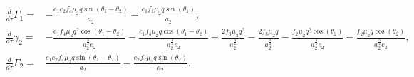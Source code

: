 \documentclass[usenatbib,twocolumn]{mnras}
\begin{document}
\begin{align}
    \frac{d}{d\tau} \Gamma_1 =&- \frac{e_{1} e_{2} f_{4} \mu_{2} q \sin{\left(\theta_{1} - \theta_{2} \right)}}{a_{2}} - \frac{e_{1} f_{1} \mu_{2} q \sin{\left(\theta_{1} \right)}}{a_{2}},\\
    \frac{d}{d\tau} \gamma_2 =&- \frac{e_{1} f_{4} \mu_{2} q^{2} \cos{\left(\theta_{1} - \theta_{2} \right)}}{a_{2}^{\frac{3}{2}} e_{2}} - \frac{e_{1} f_{4} \mu_{2} q \cos{\left(\theta_{1} - \theta_{2} \right)}}{a_{2}^{\frac{3}{2}} e_{2}} - \frac{2 f_{3} \mu_{2} q^{2}}{a_{2}^{\frac{3}{2}}} - \frac{2 f_{3} \mu_{2} q}{a_{2}^{\frac{3}{2}}} - \frac{f_{2} \mu_{2} q^{2} \cos{\left(\theta_{2} \right)}}{a_{2}^{\frac{3}{2}} e_{2}} - \frac{f_{2} \mu_{2} q \cos{\left(\theta_{2} \right)}}{a_{2}^{\frac{3}{2}} e_{2}}, \\
    \frac{d}{d\tau} \Gamma_2 =&\frac{e_{1} e_{2} f_{4} \mu_{2} q \sin{\left(\theta_{1} - \theta_{2} \right)}}{a_{2}} - \frac{e_{2} f_{2} \mu_{2} q \sin{\left(\theta_{2} \right)}}{a_{2}} .
\end{align}
\end{document}

